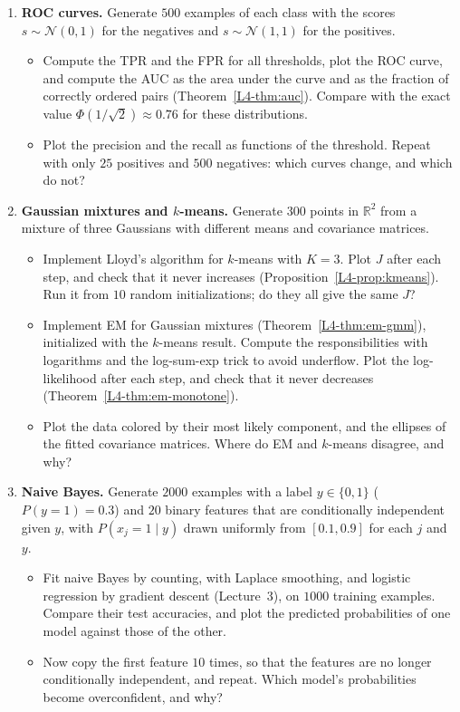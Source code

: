 \begin{enumerate}[label=\textbf{P\arabic*.}, leftmargin=*]
    \item \textbf{ROC curves.} Generate $500$ examples of each class with the scores $s \sim \mathcal{N}(0, 1)$ for the negatives and $s \sim \mathcal{N}(1, 1)$ for the positives.
    \begin{itemize}
        \item Compute the TPR and the FPR for all thresholds, plot the ROC curve, and compute the AUC as the area under the curve and as the fraction of correctly ordered pairs (Theorem~\ref{L4-thm:auc}). Compare with the exact value $\Phi(1/\sqrt{2}) \approx 0.76$ for these distributions.
        \item Plot the precision and the recall as functions of the threshold. Repeat with only $25$ positives and $500$ negatives: which curves change, and which do not?
    \end{itemize}

    \item \textbf{Gaussian mixtures and $k$-means.} Generate $300$ points in $\mathbb{R}^2$ from a mixture of three Gaussians with different means and covariance matrices.
    \begin{itemize}
        \item Implement Lloyd's algorithm for $k$-means with $K = 3$. Plot $J$ after each step, and check that it never increases (Proposition~\ref{L4-prop:kmeans}). Run it from $10$ random initializations; do they all give the same $J$?
        \item Implement EM for Gaussian mixtures (Theorem~\ref{L4-thm:em-gmm}), initialized with the $k$-means result. Compute the responsibilities with logarithms and the log-sum-exp trick to avoid underflow. Plot the log-likelihood after each step, and check that it never decreases (Theorem~\ref{L4-thm:em-monotone}).
        \item Plot the data colored by their most likely component, and the ellipses of the fitted covariance matrices. Where do EM and $k$-means disagree, and why?
    \end{itemize}

    \item \textbf{Naive Bayes.} Generate $2000$ examples with a label $y \in \{0, 1\}$ ($P(y = 1) = 0.3$) and $20$ binary features that are conditionally independent given $y$, with $P(x_j = 1 \mid y)$ drawn uniformly from $[0.1, 0.9]$ for each $j$ and $y$.
    \begin{itemize}
        \item Fit naive Bayes by counting, with Laplace smoothing, and logistic regression by gradient descent (Lecture~3), on $1000$ training examples. Compare their test accuracies, and plot the predicted probabilities of one model against those of the other.
        \item Now copy the first feature $10$ times, so that the features are no longer conditionally independent, and repeat. Which model's probabilities become overconfident, and why?
    \end{itemize}


\end{enumerate}
